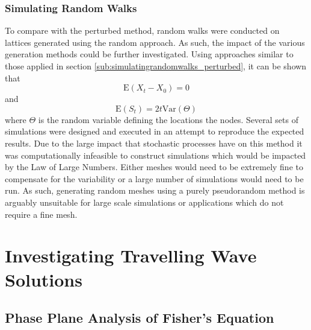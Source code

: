 \documentclass[11pt,a4paper]{article}
\begin{document}

		\subsubsection{Simulating Random Walks}
		\label{sub:simulatingrandomwalks_random}
			
			To compare with the perturbed method, random walks were conducted on lattices generated using the random approach. As such, the impact of the various generation methods could be further investigated. Using approaches similar to those applied in section \ref{sub:simulatingrandomwalks_perturbed}, it can be shown that
			\begin{equation*}
				\mathrm{E} \left(X_t - X_0 \right) = 0
			\end{equation*}
			and 
			\begin{equation*}
				\mathrm{E} \left(S_t \right) = 2 t \mathrm{Var} \left(\Theta \right)
			\end{equation*}
			where $\Theta$ is the random variable defining the locations the nodes. Several sets of simulations were designed and executed in an attempt to reproduce the expected results. Due to the large impact that stochastic processes have on this method it was computationally infeasible to construct simulations which would be impacted by the Law of Large Numbers. Either meshes would need to be extremely fine to compensate for the variability or a large number of simulations would need to be run. As such, generating random meshes using a purely pseudorandom method is arguably unsuitable for large scale simulations or applications which do not require a fine mesh. 
		
	


\section{Investigating Travelling Wave Solutions}
	\label{sec:investigatingfishersequation}
	
	\subsection{Phase Plane Analysis of Fisher's Equation}
		\label{sub:phaseplaneanalysisoffishersequation}
		
\end{document}
